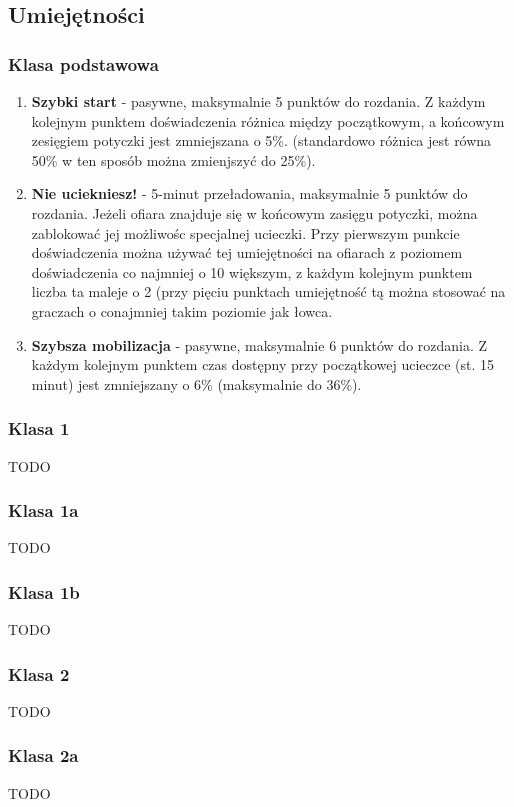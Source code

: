 \documentclass[a4paper,11pt,notitlepage]{article}
\begin{document}
\subsection{Umiejętności}
\subsubsection{Klasa podstawowa}
\begin{enumerate}
\item \textbf{Szybki start} - pasywne, maksymalnie 5 punktów do rozdania. Z każdym kolejnym punktem doświadczenia różnica między początkowym, a końcowym zesięgiem potyczki jest zmniejszana o 5\%. (standardowo różnica jest równa 50\% w ten sposób można zmienjszyć do 25\%).

\item \textbf{Nie uciekniesz!} - 5-minut przeładowania, maksymalnie 5 punktów do rozdania. Jeżeli ofiara znajduje się w końcowym zasięgu potyczki, można zablokować jej możliwośc specjalnej ucieczki. Przy pierwszym punkcie doświadczenia można używać tej umiejętności na ofiarach z poziomem doświadczenia co najmniej o 10 większym, z każdym kolejnym punktem liczba ta maleje o 2 (przy pięciu punktach umiejętność tą można stosować na graczach o conajmniej takim poziomie jak łowca.

\item \textbf{Szybsza mobilizacja} - pasywne, maksymalnie 6 punktów do rozdania. Z każdym kolejnym punktem czas dostępny przy początkowej ucieczce (st. 15 minut) jest zmniejszany o 6\% (maksymalnie do 36\%).
\end{enumerate}

\subsubsection{Klasa 1}
TODO
\subsubsection{Klasa 1a}
TODO
\subsubsection{Klasa 1b}
TODO

\subsubsection{Klasa 2}
TODO
\subsubsection{Klasa 2a}
TODO
\end{document}
